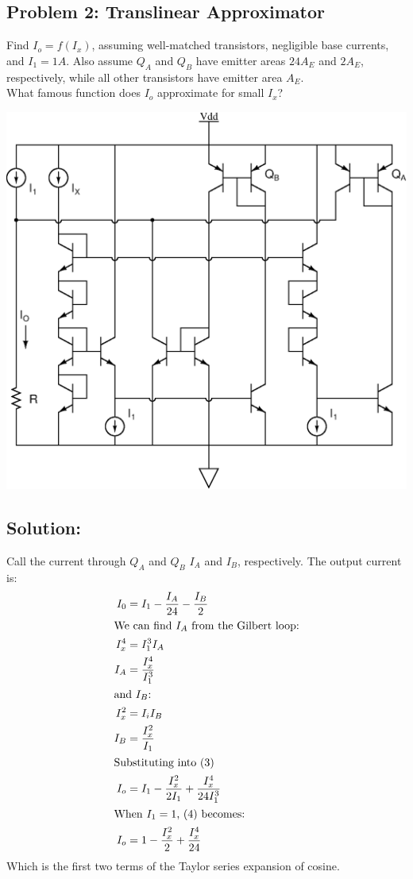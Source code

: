 \documentclass[11pt,twoside]{article}
\begin{document}
\subsection*{Problem 2: Translinear Approximator}
Find $I_o=f(I_x)$, assuming well-matched transistors, negligible base currents, and $I_1=1A$.
Also assume $Q_A$ and $Q_B$ have emitter areas $24A_E$ and $2A_E$, respectively, while all other transistors have emitter area $A_E$. \\
What famous function does $I_o$ approximate for small $I_x$?\\
\vspace{4ex}
\begin{center}
\includegraphics[width=.9\textwidth]{cos.eps}
\end{center}
\subsection*{Solution:}
Call the current through $Q_A$ and $Q_B$ $I_A$ and $I_B$, respectively.
The output current is:
\begin{align}
I_0&=I_1-\frac{I_A}{24}-\frac{I_B}{2}\\
\intertext{We can find $I_A$ from the Gilbert loop:}
I_x^4&=I_1^3I_A\nonumber \\
I_A&=\frac{I_x^4}{I_1^3}\nonumber \\
\intertext{and $I_B$:}
I_x^2&=I_iI_B\nonumber \\
I_B&=\frac{I_x^2}{I_1}\nonumber \\
\intertext{Substituting into (3)}
I_o &= I_1-\frac{I_x^2}{2I_1}+\frac{I_x^4}{24I_1^3}\\
\intertext{When $I_1=1$, (4) becomes:}
I_o &= 1-\frac{I_x^2}{2}+\frac{I_x^4}{24} \nonumber 
\end{align}
Which is the first two terms of the Taylor series expansion of cosine.
\end{document}
